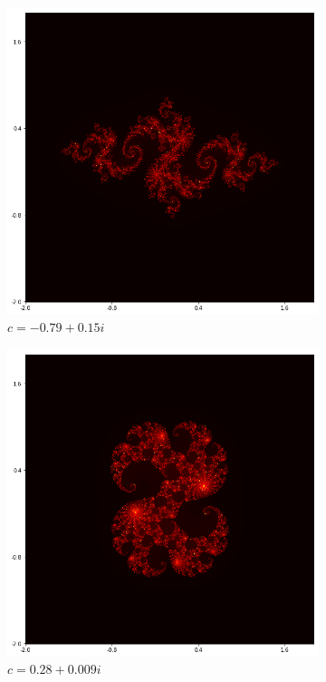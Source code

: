 \documentclass{amsart}
\theoremstyle{definition}
\theoremstyle{remark}
\numberwithin{equation}{section}
\begin{document}
\begin{figure}[h]
\centering
\begin{subfigure}{.32\textwidth}
  \centering
  \includegraphics[width=.8\linewidth]{JuliaC1.png}
  \caption{$c=-0.79+0.15i$}
\end{subfigure}%
\begin{subfigure}{.32\textwidth}
  \centering
  \includegraphics[width=.8\linewidth]{JuliaC2.png}
  \caption{$c=0.28+0.009i$}
\end{subfigure}
\begin{subfigure}{.32\textwidth}
  \centering

\end{subfigure}
\end{figure}
\end{document}
